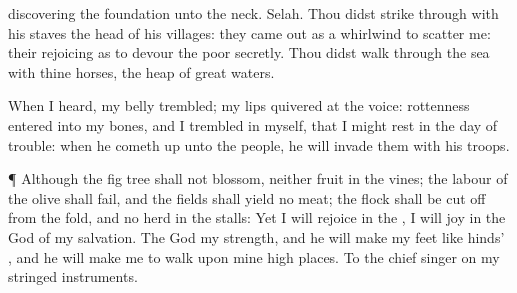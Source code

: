 {discovering the
foundation unto the
neck.
Selah.
Thou didst strike
through with his
staves the
head of his
villages: they came out as a
whirlwind to
scatter me: their
rejoicing
{} as to
devour the
poor
secretly.
Thou didst
walk through the
sea with thine
horses,
{} the
heap of
great
waters.
\par }{\PP {}When I
heard, my
belly
trembled; my
lips
quivered at the
voice:
rottenness
entered into my
bones, and I
trembled in myself, that I might
rest in the
day of
trouble: when he cometh
up unto the
people, he will invade them with his
troops.
\par }{\PP {}¶ Although the fig
tree shall not
blossom, neither
{}
fruit
{} in the
vines; the
labour of the
olive shall
fail, and the
fields shall
yield no
meat; the
flock shall be cut
off from the
fold, and
{} no
herd in the
stalls:
Yet I will
rejoice in the
{}, I will
joy in the
God of my
salvation.
The
{}
God
{} my
strength, and he will
make my
feet like
hinds’
{}, and he will make me to
walk upon mine high
places. To the chief
singer on my stringed
instruments.
\par }